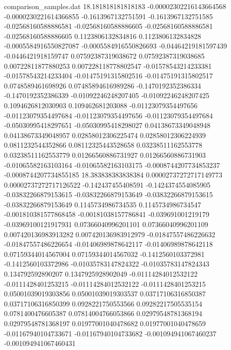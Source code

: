 \begin{filecontents}{comparison_samples.dat}
18.181818181818183  -0.00002302216143664568 -0.0000230221614366855  -0.1613967132751591    -0.1613967132751585    -0.02568160588886581   -0.02568160588886605   -0.02568160588886581   -0.02568160588886605   0.1123806132834816     0.1123806132834828     -0.0005584916550827087  -0.0005584916550826693  -0.04464219181597439   -0.0446421918159747    0.07592387319038672     0.07592387319038685     0.00722811877880253     0.007228118778802547    -0.01578543214233381    -0.01578543214233404    -0.01475191315802516    -0.01475191315802517    0.0748589461698926      0.07485894616989286     -0.1470192352386334     -0.1470192352386339     -0.01092246248207405   -0.01092246248207425   0.1094626812030903     0.109462681203088      -0.01123079354497656    -0.01123079354497684    -0.01123079354497656    -0.01123079354497684    -0.05030995418297651   -0.05030995418298027   0.04138673349048948     0.04138673349048957     0.02858012306225474    0.02858012306224939    0.0811232544352866      0.08112325443528658     0.03238511162553778     0.03238511162553779     0.01266560886731927    0.01266560886731903    -0.01065582163103164   -0.01065582163103175   -0.0008744207734853237  -0.0008744207734855185
18.383838383838384  0.00002737272717149773  0.00002737272717126522  -0.142437455408591     -0.1424374554085905    -0.03832266879153615   -0.03832266879153649   -0.03832266879153615   -0.03832266879153649   0.1145734986734535     0.1145734986734547     -0.001810381577868458   -0.00181038157786841    -0.039691001219179     -0.03969100121917931   0.07366040996201101     0.07366040996201109     0.007420136983913282    0.007420136983912979    -0.01847557486226632    -0.01847557486226654    -0.01406989878642117    -0.01406989878642118    0.07159344014567004     0.07159344014567032     -0.1412560103372981     -0.1412560103372986     -0.01035783147824322   -0.01035783147824343   0.134792592890207      0.1347925928902049     -0.01114284012532122    -0.0111428401253215     -0.01114284012532122    -0.0111428401253215     0.05001039019303856    0.05001039019303537    0.03717106316850387     0.03717106316850399     0.0928221750553566     0.09282217505535154    0.0781400476605387      0.07814004766053866     0.02979548781368194     0.02979548781368197     0.01977001040478682    0.01977001040478659    -0.01167940104733671   -0.01167940104733682   -0.001094941067460237   -0.001094941067460431 

\end{filecontents}
